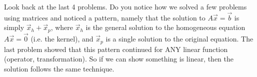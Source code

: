 Look back at the last 4 problems. Do you notice how we solved a few problems using matrices and noticed a pattern, namely that the solution to $A\vec x=\vec b$ is simply $\vec x_h+\vec x_p$, where $\vec x_h$ is the general solution to the homogeneous equation $A\vec x=\vec 0$ (i.e. the kernel), and $\vec x_p$ is a single solution to the original equation.  
The last problem showed that this pattern continued for ANY linear function (operator, transformation). So if we can show something is linear, then the solution follows the same technique. 



